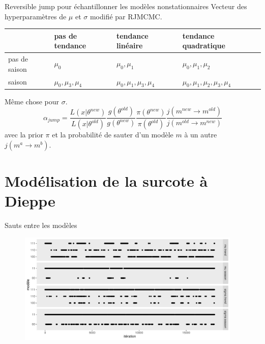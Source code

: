 \documentclass[aspectratio=169]{beamer}
\begin{document}
\begin{frame}{Reversible jump pour échantillonner les modèles nonstationnaires}
Vecteur des hyperparamètres de $\mu$ et $\sigma$ modifié par RJMCMC.
\vspace{0.5cm} \\
\begin{centering}
\begin{tabular}{ l|lll }
  & pas de tendance & tendance linéaire & tendance quadratique \\
 \hline
 pas de saison & $\mu_0$ & $\mu_0, \mu_1$ & $\mu_0, \mu_1, \mu_2$ \\ 
 saison & $\mu_0, \mu_3, \mu_4$ & $\mu_0, \mu_1, \mu_3, \mu_4$ & $\mu_0, \mu_1, \mu_2, \mu_3, \mu_4$ \\
 \hline
\end{tabular}
\end{centering}
Même chose pour $\sigma$.
\begin{equation*}
\alpha_{jump} =
\dfrac{L(x|\theta^{new})}{L(x|\theta^{old})}
\dfrac{g(\theta^{old})}{g(\theta^{new})}
\dfrac{\pi(\theta^{new})}{\pi(\theta^{old})}
\dfrac{j(m^{new} \rightarrow m^{old})}{j(m^{old} \rightarrow m^{new})}
\end{equation*}
avec la prior $\pi$ et la probabilité de sauter d'un modèle $m$ à un autre $j(m^a \rightarrow m^b)$.
\end{frame}



\section{Modélisation de la surcote à Dieppe}


\begin{frame}{Sauts entre les modèles}
	\begin{figure}
	\vspace{-0.15cm}
	 \includegraphics[width=0.95\textwidth, center]{../figures/jumps.pdf}
	\end{figure}
\end{frame}
\end{document}
